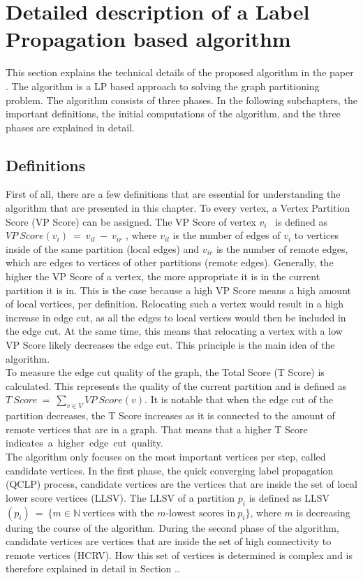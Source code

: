 \documentclass[acmsmall,nonacm,screen,review]{acmart}
\begin{document}
\section{Detailed description of a Label Propagation based algorithm}
This section explains the technical details of the proposed algorithm in the paper \cite{Main}. The algorithm is a LP based approach to solving the graph partitioning problem. The algorithm consists of three phases. In the following subchapters, the important definitions, the initial computations of the algorithm, and the three phases are explained in detail.
\subsection{Definitions}
First of all, there are a few definitions that are essential for understanding the algorithm that are presented in this chapter. To every vertex, a Vertex Partition Score (VP Score) can be assigned. The VP Score of vertex $v_{i}$ \ is defined as $VP\ Score(v_{i})\ =\ v_{il}\ -\ v_{ir}$ , where $v_{il}$ is the number of edges of $v_{i}$ to vertices inside of the same partition (local edges) and $v_{ir}$ is the number of remote edges, which are edges to vertices of other partitions (remote edges). Generally, the higher the VP Score of a vertex, the more appropriate it is in the current partition it is in. This is the case because a high VP Score means a high amount of local vertices, per definition. Relocating such a vertex would result in a high increase in edge cut, as all the edges to local vertices would then be included in the edge cut. At the same time, this means that relocating a vertex with a low VP Score likely decreases the edge cut. This principle is the main idea of the algorithm. \\
To measure the edge cut quality of the graph, the Total Score (T Score) is calculated. This represents the quality of the current partition and is defined as $T\ Score\ =\ \sum_{v\in V} VP\ Score(v)$. It is notable that when the edge cut of the partition decreases, the T Score increases as it is connected to the amount of remote vertices that are in a graph. That means that a higher T Score \hbox{indicates a higher edge cut quality.} \\
The algorithm only focuses on the most important vertices per step, called candidate vertices. In the first phase, the quick converging label propagation (QCLP) process, candidate vertices are the vertices that are inside the set of local lower score vertices (LLSV). The LLSV of a partition $p_{i}$ is defined as LLSV$(p_{i})\ =\ \{ m\in \mathbb{N}\ \text{vertices with the }m\text{-lowest scores in}\ p_{i}\}$, where $m$ is decreasing during the course of the algorithm. During the second phase of the algorithm, candidate vertices are vertices that are inside the set of high connectivity to remote vertices (HCRV). How this set of vertices is determined is complex and is therefore explained in detail in Section ..
\end{document}
